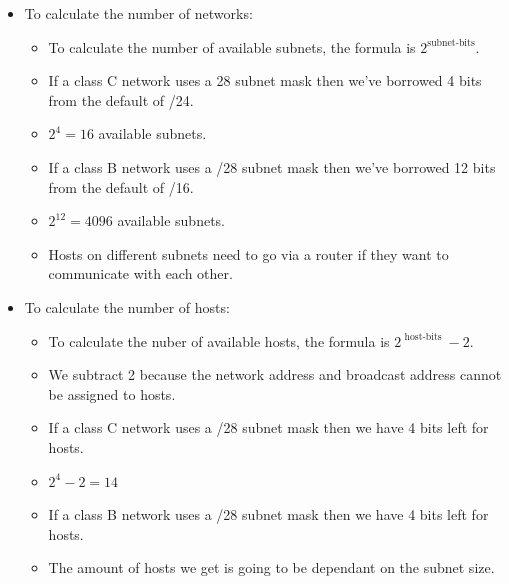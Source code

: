 \begin{itemize}
\begin{itemize}
            \item To subnet the network into smaller subnets, we need to 'borrow' host bits and add them to the network portion of the address. 
                \begin{itemize}
                    \item We are going to move the border of the subnetmask to the right. 
                    \item WHEN WE ARE DOING SUBNETTING THE LINE ALWAYS MOVES TO THE RIGHT.
                \end{itemize}
            \item The network address line always moves to the right when we subnet. 
            \item The further to the right we go, the more subnets we'ññ have of that size but less hosts.
        \end{itemize}
    
    \item To calculate the number of networks:
        \begin{itemize}
            \item To calculate the number of available subnets, the formula is $\displaystyle 2^{\text{subnet-bits}}$.
            \item If a class C network uses a 28 subnet mask then we've borrowed 4 bits from the default of /24.
            \item $\displaystyle 2^4 = 16$ available subnets.
            \item If a class B network uses a /28 subnet mask then we've borrowed 12 bits from the default of /16.
            \item $\displaystyle 2^{12} = 4096$ available subnets.
            \item Hosts on different subnets need to go via a router if they want to communicate with each other.
        \end{itemize}
    
    \item To calculate the number of hosts:
        \begin{itemize}
            \item To calculate the nuber of available hosts, the formula is $\displaystyle 2^{\text{ host-bits }} - 2$.
            \item We subtract 2 because the network address and broadcast address cannot be assigned to hosts.
            \item If a class C network uses a /28 subnet mask then we have 4 bits left for hosts.
            \item $\displaystyle 2^4-2=14$ 
            \item If a class B network uses a /28 subnet mask then we have 4 bits left for hosts.
            \item The amount of hosts we get is going to be dependant on the subnet size.
        \end{itemize}
    

\end{itemize}
